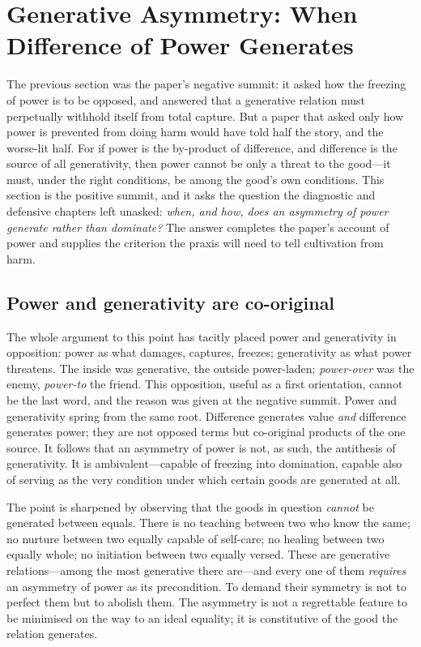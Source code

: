 \section{Generative Asymmetry: When Difference of Power Generates}
\label{p17:sec:asymmetry}

\noindent
The previous section was the paper's negative summit: it asked how the freezing of power is to be opposed, and answered that a generative relation must perpetually withhold itself from total capture. But a paper that asked only how power is prevented from doing harm would have told half the story, and the worse-lit half. For if power is the by-product of difference, and difference is the source of all generativity, then power cannot be only a threat to the good---it must, under the right conditions, be among the good's own conditions. This section is the positive summit, and it asks the question the diagnostic and defensive chapters left unasked: \emph{when, and how, does an asymmetry of power generate rather than dominate?} The answer completes the paper's account of power and supplies the criterion the praxis will need to tell cultivation from harm.

\subsection{Power and generativity are co-original}
\label{p17:sub:asymmetry-coorigin}

The whole argument to this point has tacitly placed power and generativity in opposition: power as what damages, captures, freezes; generativity as what power threatens. The inside was generative, the outside power-laden; \emph{power-over} was the enemy, \emph{power-to} the friend. This opposition, useful as a first orientation, cannot be the last word, and the reason was given at the negative summit. Power and generativity spring from the same root. Difference generates value \emph{and} difference generates power; they are not opposed terms but co-original products of the one source. It follows that an asymmetry of power is not, as such, the antithesis of generativity. It is ambivalent---capable of freezing into domination, capable also of serving as the very condition under which certain goods are generated at all.

The point is sharpened by observing that the goods in question \emph{cannot} be generated between equals. There is no teaching between two who know the same; no nurture between two equally capable of self-care; no healing between two equally whole; no initiation between two equally versed. These are generative relations---among the most generative there are---and every one of them \emph{requires} an asymmetry of power as its precondition. To demand their symmetry is not to perfect them but to abolish them. The asymmetry is not a regrettable feature to be minimised on the way to an ideal equality; it is constitutive of the good the relation generates.

